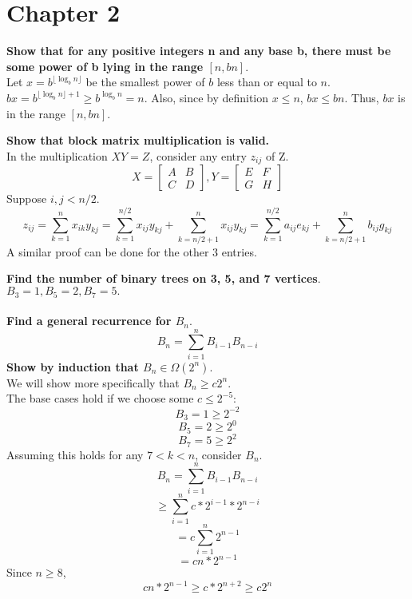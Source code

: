 \section{Chapter 2}

\begin{problem}{2.2}
\textbf{Show that for any positive integers n and any base b, there must be some power of b lying in the range $[n, bn]$}.
\\
Let $x = b^{\lfloor \log_b n \rfloor}$ be the smallest power of $b$ less than or equal to $n$. $bx = b^{\lfloor \log_b n \rfloor + 1} \geq b^{\log_b n} = n$. Also, since by definition $x \leq n$, $bx \leq bn$. Thus, $bx$ is in the range $[n, bn]$.
\end{problem}

\begin{problem}{2.11}
    \textbf{Show that block matrix multiplication is valid.}
    \\
    In the multiplication $XY = Z$, consider any entry $z_{ij}$ of Z.
    \[
        X = 
        \begin{bmatrix}
        A & B \\ C & D
        \end{bmatrix}, 
        Y = 
        \begin{bmatrix}
        E & F \\ G & H
        \end{bmatrix}
    \]
    Suppose $i, j < n / 2$.
    \[
        z_{ij} = \sum_{k = 1}^{n} x_{ik}y_{kj} = \sum_{k = 1}^{n / 2} x_{ij}y_{kj} + \sum_{k = n / 2 + 1}^{n} x_{ij}y_{kj} = \sum_{k = 1}^{n / 2} a_{ij}e_{kj} + \sum_{k = n / 2 + 1}^{n} b_{ij}g_{kj}
    \]
    A similar proof can be done for the other 3 entries.
\end{problem}

\begin{problem}{2.13}
    \textbf{Find the number of binary trees on 3, 5, and 7 vertices}. \\
    $B_3 = 1, B_5 = 2, B_7 = 5.$ \\ \\
    \textbf{Find a general recurrence for $B_n$}.
    \[
        B_n = \sum_{i = 1}^{n} B_{i - 1}B_{n - i}
    \]
    \textbf{Show by induction that $B_n \in \Omega(2^n).$} \\
    We will show more specifically that $B_n \geq c 2^{n}$. \\
    The base cases hold if we choose some $c \leq 2^{-5}$:
    \[
        B_3 = 1 \geq 2^{-2}
    \]
    \[
        B_5 = 2 \geq 2^0
    \]
    \[
        B_7 = 5 \geq 2^2
    \]
    Assuming this holds for any $7 < k < n$, consider $B_n.$
    \[
        B_n = \sum_{i = 1}^{n} B_{i - 1}B_{n - i}
    \]
    \[
        \geq \sum_{i = 1}^{n} c * 2^{i - 1} * 2^{n - i}
    \]
    \[
        = c \sum_{i = 1}^{n} 2^{n - 1}
    \]
    \[
        = cn * 2^{n - 1}
    \]
    Since $n \geq 8$,
    \[
        cn * 2^{n - 1} \geq c * 2^{n + 2} \geq c2^n
    \]
\end{problem}

